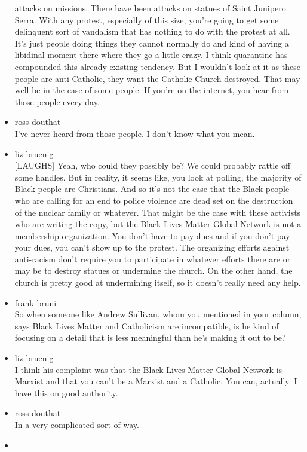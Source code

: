 \begin{itemize}
  attacks on missions. There have been attacks on statues of Saint
  Junipero Serra. With any protest, especially of this size, you're
  going to get some delinquent sort of vandalism that has nothing to do
  with the protest at all. It's just people doing things they cannot
  normally do and kind of having a libidinal moment there where they go
  a little crazy. I think quarantine has compounded this
  already-existing tendency. But I wouldn't look at it as these people
  are anti-Catholic, they want the Catholic Church destroyed. That may
  well be in the case of some people. If you're on the internet, you
  hear from those people every day.
\item
  ross douthat\\
  I've never heard from those people. I don't know what you mean.
\item
  liz bruenig\\
  {[}LAUGHS{]} Yeah, who could they possibly be? We could probably
  rattle off some handles. But in reality, it seems like, you look at
  polling, the majority of Black people are Christians. And so it's not
  the case that the Black people who are calling for an end to police
  violence are dead set on the destruction of the nuclear family or
  whatever. That might be the case with these activists who are writing
  the copy, but the Black Lives Matter Global Network is not a
  membership organization. You don't have to pay dues and if you don't
  pay your dues, you can't show up to the protest. The organizing
  efforts against anti-racism don't require you to participate in
  whatever efforts there are or may be to destroy statues or undermine
  the church. On the other hand, the church is pretty good at
  undermining itself, so it doesn't really need any help.
\item
  frank bruni\\
  So when someone like Andrew Sullivan, whom you mentioned in your
  column, says Black Lives Matter and Catholicism are incompatible, is
  he kind of focusing on a detail that is less meaningful than he's
  making it out to be?
\item
  liz bruenig\\
  I think his complaint was that the Black Lives Matter Global Network
  is Marxist and that you can't be a Marxist and a Catholic. You can,
  actually. I have this on good authority.
\item
  ross douthat\\
  In a very complicated sort of way.
\item

\end{itemize}

